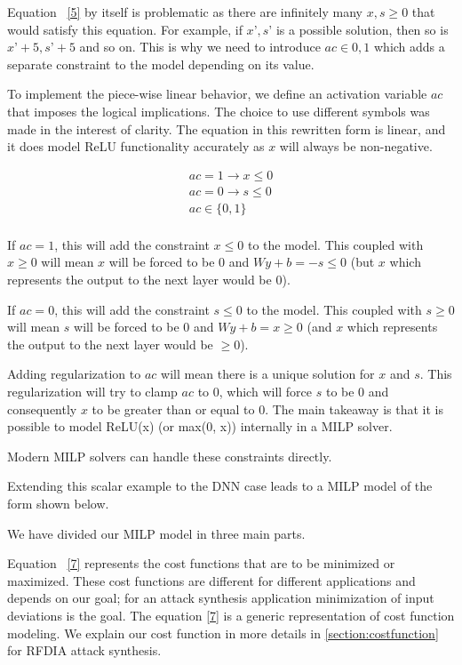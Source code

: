 Equation ~\ref{5} by itself is problematic as there are infinitely many $x, s \geq 0$ that would satisfy this equation. For example, if $x’, s’$ is a possible solution, then so is $x’ + 5, s’ + 5$ and so on. This is why we need to introduce $ac \in {0, 1}$ which adds a separate constraint to the model depending on its value.






 To implement the piece-wise linear behavior, we define an activation variable $ac$ that imposes the logical implications. 
The choice to use different symbols was made in the interest of clarity. 
The equation in this rewritten form is linear, and it does model ReLU functionality  accurately as $x$ will always be non-negative. 

\begin{equation}
\label{6}
\begin{aligned}
ac =  1 \rightarrow x \leq 0  \\
ac =  0 \rightarrow s \leq 0  \\
ac \in \{0,1\} \\
\end{aligned}
\end{equation}

If $ac = 1$, this will add the constraint $x \leq 0$ to the model. This coupled with $x \geq 0$ will mean $x$ will be forced to be $0$ and $Wy + b = - s \leq 0$ (but $x$ which represents the output to the next layer would be $0$).

If $ac = 0$, this will add the constraint $s \leq 0$ to the model. This coupled with $s \geq 0$ will mean $s$ will be forced to be $0$ and $Wy + b = x \geq 0$ (and $x$ which represents the output to the next layer would be $\geq 0$).

Adding regularization to $ac$ will mean there is a unique solution for $x$ and $s$. This regularization will try to clamp $ac$ to 0, which will force $s$ to be 0 and consequently $x$ to be greater than or equal to 0. The main takeaway is that it is possible to model ReLU(x) (or max(0, x)) internally in a MILP solver.

Modern MILP solvers can handle these constraints directly.




Extending this scalar example to the DNN case leads to a \ac{MILP} model of the form shown below. 


We have divided our \ac{MILP} model in three main parts. 


Equation ~\ref{7} represents the cost functions that are to be minimized or maximized.
These cost functions are different for different applications and depends on our goal; for an attack synthesis application minimization of input deviations is the goal.
The equation \ref{7} is a generic representation of cost function modeling. 
We explain our cost function in more details in \ref{section:costfunction} for \ac{RFDIA} attack synthesis. 

